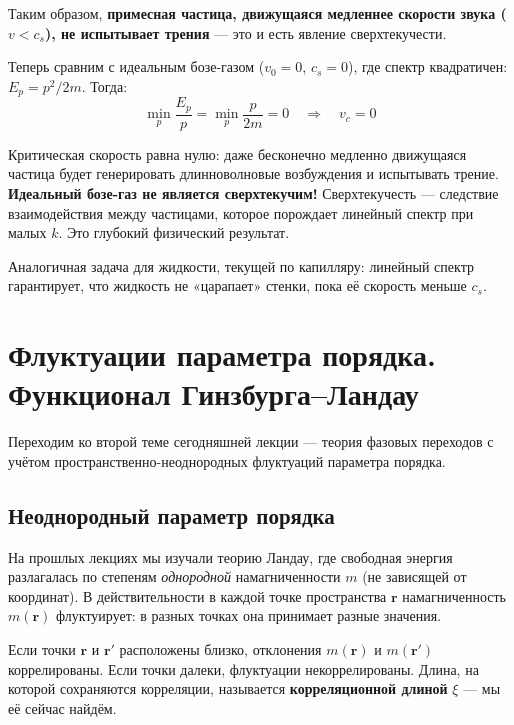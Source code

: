 \documentclass[../general/general]{subfiles}
\begin{document}
Таким образом, \textbf{примесная частица, движущаяся медленнее скорости звука ($v < c_s$), не испытывает трения} --- это и есть явление сверхтекучести.

Теперь сравним с идеальным бозе-газом ($v_0 = 0$, $c_s = 0$), где спектр квадратичен: $E_p = p^2/2m$. Тогда:
\begin{equation}
    \min_p \frac{E_p}{p} = \min_p \frac{p}{2m} = 0 \quad \Rightarrow \quad v_c = 0
\end{equation}

Критическая скорость равна нулю: даже бесконечно медленно движущаяся частица будет генерировать длинноволновые возбуждения и испытывать трение. \textbf{Идеальный бозе-газ не является сверхтекучим!} Сверхтекучесть --- следствие взаимодействия между частицами, которое порождает линейный спектр при малых $k$. Это глубокий физический результат.

Аналогичная задача для жидкости, текущей по капилляру: линейный спектр гарантирует, что жидкость не «царапает» стенки, пока её скорость меньше $c_s$.


\section{Флуктуации параметра порядка. Функционал Гинзбурга--Ландау}

Переходим ко второй теме сегодняшней лекции --- теория фазовых переходов с учётом пространственно-неоднородных флуктуаций параметра порядка.

\subsection{Неоднородный параметр порядка}

На прошлых лекциях мы изучали теорию Ландау, где свободная энергия разлагалась по степеням \emph{однородной} намагниченности $m$ (не зависящей от координат). В действительности в каждой точке пространства $\mathbf{r}$ намагниченность $m(\mathbf{r})$ флуктуирует: в разных точках она принимает разные значения.

Если точки $\mathbf{r}$ и $\mathbf{r}'$ расположены близко, отклонения $m(\mathbf{r})$ и $m(\mathbf{r}')$ коррелированы. Если точки далеки, флуктуации некоррелированы. Длина, на которой сохраняются корреляции, называется \textbf{корреляционной длиной} $\xi$ --- мы её сейчас найдём.
\end{document}
